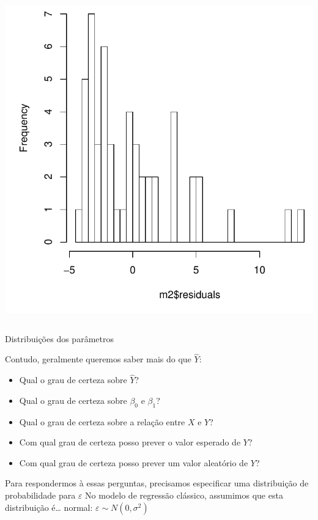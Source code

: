 \documentclass{beamer}\usepackage[]{graphicx}\usepackage[]{color}
\newenvironment{knitrout}{}{} %
\renewenvironment{knitrout}{\setlength{\topsep}{0mm}}{}
\begin{document}
\begin{frame}[fragile]
\begin{columns}[b]
\begin{knitrout}
\includegraphics[width=0.8\linewidth]{figure/unnamed-chunk-4-2} 

\end{knitrout}

\end{columns}

\end{frame}

\begin{frame}{Distribuições dos parâmetros}

Contudo, geralmente queremos saber mais do que $\hat{Y}$:

\vfill
\begin{itemize}
  \item Qual o grau de certeza sobre $\hat Y$? \pause
  \item Qual o grau de certeza sobre $\beta _0$ e $\beta_1$? \pause
  \item Qual o grau de certeza sobre a relação entre $X$ e $Y$? \pause
  \item Com qual grau de certeza posso prever o valor esperado de $Y$? \pause
  \item Com qual grau de certeza posso prever um valor aleatório de $Y$? \pause
\end{itemize} 
\vfill
Para respondermos à essas perguntas, precisamos especificar uma distribuição de probabilidade para $\varepsilon$
\vfill
No modelo de regressão clássico, assumimos que esta distribuição é\ldots \pause
normal: $\varepsilon \sim N(0,\sigma ^2)$

\end{frame}
\end{document}
